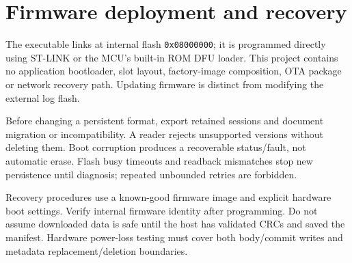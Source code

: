 \section{Firmware deployment and recovery}
The executable links at internal flash \texttt{0x08000000}; it is programmed directly using ST-LINK or the MCU's built-in ROM DFU loader. This project contains no application bootloader, slot layout, factory-image composition, OTA package or network recovery path. Updating firmware is distinct from modifying the external log flash.

Before changing a persistent format, export retained sessions and document migration or incompatibility. A reader rejects unsupported versions without deleting them. Boot corruption produces a recoverable status/fault, not automatic erase. Flash busy timeouts and readback mismatches stop new persistence until diagnosis; repeated unbounded retries are forbidden.

Recovery procedures use a known-good firmware image and explicit hardware boot settings. Verify internal firmware identity after programming. Do not assume downloaded data is safe until the host has validated CRCs and saved the manifest. Hardware power-loss testing must cover both body/commit writes and metadata replacement/deletion boundaries.

